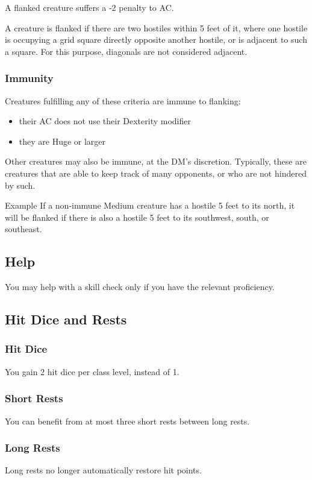 \documentclass[letterpaper,twocolumn,openany,nodeprecatedcode]{dndbook}
\begin{document}
A flanked creature suffers a -2 penalty to AC.

A creature is flanked if there are two hostiles within 5 feet of it, where one hostile is occupying a grid square directly opposite another hostile, or is adjacent to such a square. For this purpose, diagonals are not considered adjacent.

\subsubsection{Immunity}
Creatures fulfilling any of these criteria are immune to flanking:
\begin{itemize}
    \item their AC does not use their Dexterity modifier
    \item they are Huge or larger
\end{itemize}
Other creatures may also be immune, at the DM's discretion. Typically, these are creatures that are able to keep track of many opponents, or who are not hindered by such.

\begin{DndComment}{Example}
If a non-immune Medium creature has a hostile 5 feet to its north, it will be flanked if there is also a hostile 5 feet to its southwest, south, or southeast.
\end{DndComment}

\subsection{Help}
You may help with a skill check only if you have the relevant proficiency.

\subsection{Hit Dice and Rests}
\subsubsection{Hit Dice}
You gain 2 hit dice per class level, instead of 1.

\subsubsection{Short Rests}
You can benefit from at most three short rests between long rests.

\subsubsection{Long Rests}
Long rests no longer automatically restore hit points.
\end{document}
